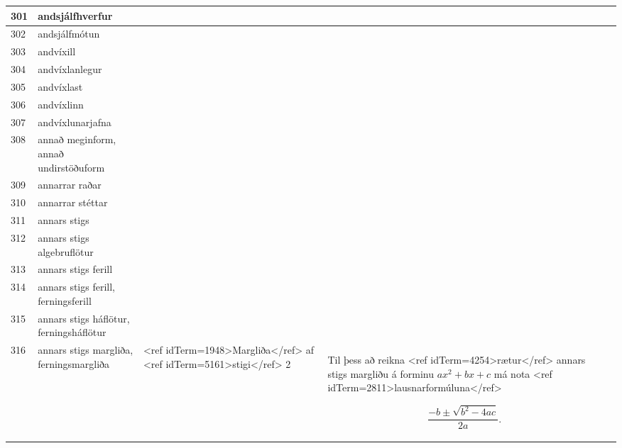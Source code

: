 \begin{longtable}{p{}|p{}|p{}|p{}|p{}}
301 & andsjálfhverfur &  &  &  \\
\hline
302 & andsjálfmótun &  &  &  \\
\hline
303 & andvíxill &  &  &  \\
\hline
304 & andvíxlanlegur &  &  &  \\
\hline
305 & andvíxlast &  &  &  \\
\hline
306 & andvíxlinn &  &  &  \\
\hline
307 & andvíxlunarjafna &  &  &  \\
\hline
308 & annað meginform, annað undirstöðuform &  &  &  \\
\hline
309 & annarrar raðar &  &  &  \\
\hline
310 & annarrar stéttar &  &  &  \\
\hline
311 & annars stigs &  &  &  \\
\hline
312 & annars stigs algebruflötur &  &  &  \\
\hline
313 & annars stigs ferill &  &  &  \\
\hline
314 & annars stigs ferill, ferningsferill &  &  &  \\
\hline
315 & annars stigs háflötur, ferningsháflötur &  &  &  \\
\hline
316 & annars stigs margliða, ferningsmargliða & <ref idTerm=1948>Margliða</ref> af <ref idTerm=5161>stigi</ref> 2 & Til þess að reikna <ref idTerm=4254>rætur</ref> annars stigs margliðu á forminu $ax^2 + bx + c$ má nota <ref idTerm=2811>lausnarformúluna</ref>

\[ \frac{-b \pm \sqrt{b^2-4ac}}{2a}. \] 


\end{longtable}
